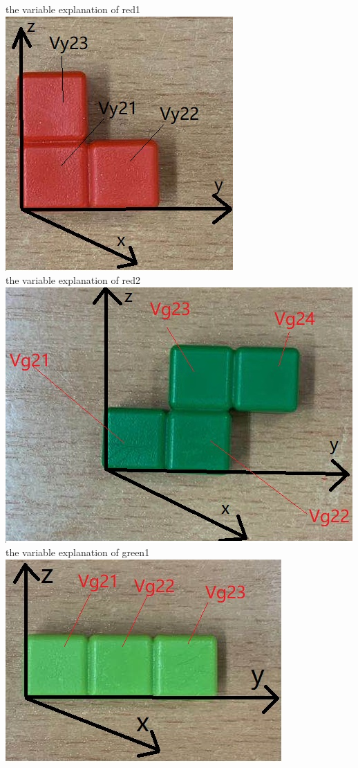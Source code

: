 \begin{center}
the variable explanation of red1
\includegraphics{3Dred2.jpg}\\
the variable explanation of red2
\includegraphics{3Dgreen1.jpg}\\
the variable explanation of green1
\includegraphics{3Dgreen2.jpg}\\

\end{center}
